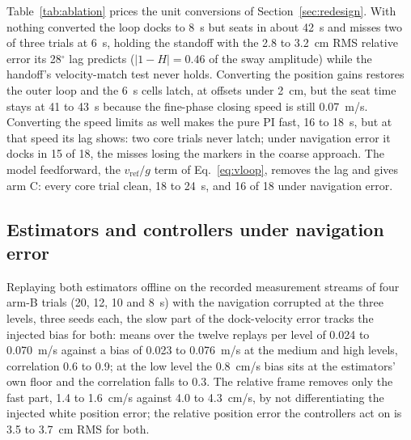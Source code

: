 Table~\ref{tab:ablation} prices the unit conversions of Section~\ref{sec:redesign}. With nothing converted the loop docks to 8~s but seats in about 42~s and misses two of three trials at 6~s, holding the standoff with the 2.8 to 3.2~cm RMS relative error its 28$^\circ$ lag predicts ($|1-H| = 0.46$ of the sway amplitude) while the handoff's velocity-match test never holds. Converting the position gains restores the outer loop and the 6~s cells latch, at offsets under 2~cm, but the seat time stays at 41 to 43~s because the fine-phase closing speed is still 0.07~m/s. Converting the speed limits as well makes the pure PI fast, 16 to 18~s, but at that speed its lag shows: two core trials never latch; under navigation error it docks in 15 of 18, the misses losing the markers in the coarse approach. The model feedforward, the $v_{\mathrm{ref}}/g$ term of Eq.~\eqref{eq:vloop}, removes the lag and gives arm C: every core trial clean, 18 to 24~s, and 16 of 18 under navigation error.

\subsection{Estimators and controllers under navigation error}

Replaying both estimators offline on the recorded measurement streams of four arm-B trials (20, 12, 10 and 8~s) with the navigation corrupted at the three levels, three seeds each, the slow part of the dock-velocity error tracks the injected bias for both: means over the twelve replays per level of 0.024 to 0.070~m/s against a bias of 0.023 to 0.076~m/s at the medium and high levels, correlation 0.6 to 0.9; at the low level the 0.8~cm/s bias sits at the estimators' own floor and the correlation falls to 0.3. The relative frame removes only the fast part, 1.4 to 1.6~cm/s against 4.0 to 4.3~cm/s, by not differentiating the injected white position error; the relative position error the controllers act on is 3.5 to 3.7~cm RMS for both.

